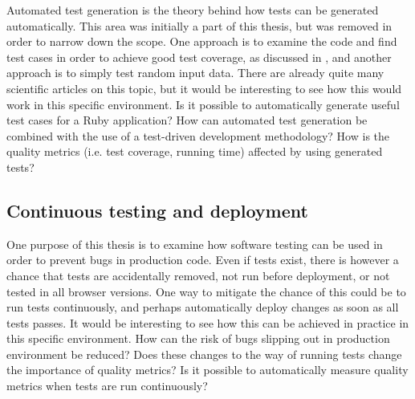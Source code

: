 Automated test generation is the theory behind how tests can be
generated automatically. This area was initially a part of this thesis,
but was removed in order to narrow down the scope. One approach is to
examine the code and find test cases in order to achieve good test
coverage, as discussed in , and another
approach is to simply test random input data. There are already quite
many scientific articles on this topic, but it would be interesting to
see how this would work in this specific environment. Is it possible to
automatically generate useful test cases for a Ruby application? How can
automated test generation be combined with the use of a test-driven
development methodology? How is the quality metrics (i.e. test coverage,
running time) affected by using generated tests?\\


\subsection{Continuous testing and deployment}

One purpose of this thesis is to examine how software testing can be
used in order to prevent bugs in production code. Even if tests exist,
there is however a chance that tests are accidentally removed, not run
before deployment, or not tested in all browser versions. One way to
mitigate the chance of this could be to run tests continuously, and
perhaps automatically deploy changes as soon as all tests passes. It
would be interesting to see how this can be achieved in practice in this
specific environment. How can the risk of bugs slipping out in
production environment be reduced? Does these changes to the way of
running tests change the importance of quality metrics? Is it possible
to automatically measure quality metrics when tests are run
continuously?\\

